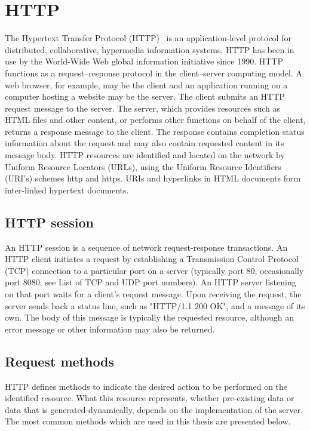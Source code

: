 \section{HTTP}
The Hypertext Transfer Protocol (HTTP)~\cite{fielding2006hypertext} is an application-level protocol for distributed, collaborative, hypermedia information systems. HTTP has been in use by the World-Wide Web global information initiative since 1990. HTTP functions as a request–response protocol in the client–server computing model. A web browser, for example, may be the client and an application running on a computer hosting a website may be the server. The client submits an HTTP request message to the server. The server, which provides resources such as HTML files and other content, or performs other functions on behalf of the client, returns a response message to the client. The response contains completion status information about the request and may also contain requested content in its message body. HTTP resources are identified and located on the network by Uniform Resource Locators (URLs), using the Uniform Resource Identifiers (URI's) schemes http and https. URIs and hyperlinks in HTML documents form inter-linked hypertext documents.




\subsection{HTTP session}
An HTTP session is a sequence of network request-response transactions. An HTTP client initiates a request by establishing a Transmission Control Protocol (TCP) connection to a particular port on a server (typically port 80, occasionally port 8080; see List of TCP and UDP port numbers). An HTTP server listening on that port waits for a client's request message. Upon receiving the request, the server sends back a status line, such as "HTTP/1.1 200 OK", and a message of its own. The body of this message is typically the requested resource, although an error message or other information may also be returned.




\subsection{Request methods}
HTTP defines methods to indicate the desired action to be performed on the identified resource. What this resource represents, whether pre-existing data or data that is generated dynamically, depends on the implementation of the server. The most common methods which are used in this thesis are presented below.


